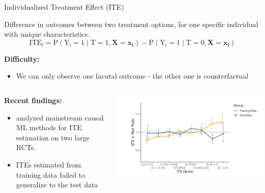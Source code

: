 \documentclass[onlytextwidth,english]{beamer}\usepackage[]{graphicx}\usepackage[]{xcolor}
\begin{document}
\begin{frame}{Individualized Treatment Effect (ITE)}

Difference in outcomes between two treatment options, for one specific individual with unique characteristics.
    \[
    \text{ITE}_\text{i} = \text{P}(\text{Y}_\text{i} = 1 \mid \text{T} = 1, \mathbf{X} = \mathbf{x_i}) - \text{P}(\text{Y}_\text{i} = 1 \mid \text{T} = 0, \mathbf{X} = \mathbf{x_i})
    \]
    
\textbf{Difficulty:} \\
\begin{itemize}
	\item We can only observe one facutal outcome - the other one is counterfactual
\end{itemize}


\begin{columns}

\begin{column}{0.55\textwidth}

\textbf{Recent findings:} \\
\begin{itemize}
    \item \citet{chen2025} analyzed mainstream causal ML methods for ITE estimation on two large RCTs.
    \item ITEs estimated
from training data failed to generalize to the test data
 \end{itemize}
\end{column}

\begin{column}{0.45\textwidth}
\includegraphics[width=\textwidth]{img/ATE_ITE.png}
\end{column}
\end{columns}

\end{frame}
\end{document}
